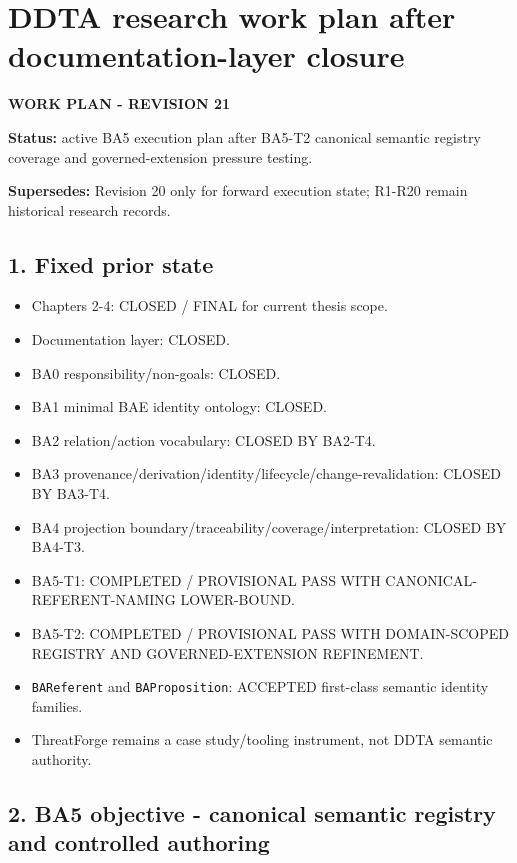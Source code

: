 \documentclass[
  10pt,
  a4paper,
]{article}
\author{}
\date{}
\providecommand{\tightlist}{%
  \setlength{\itemsep}{0pt}\setlength{\parskip}{0pt}}
\begin{document}
\section{DDTA research work plan after documentation-layer
closure}\label{ddta-research-work-plan-after-documentation-layer-closure}

\textbf{WORK PLAN - REVISION 21}

\textbf{Status:} active BA5 execution plan after BA5-T2 canonical
semantic registry coverage and governed-extension pressure testing.

\textbf{Supersedes:} Revision 20 only for forward execution state;
R1-R20 remain historical research records.

\subsection{1. Fixed prior state}\label{fixed-prior-state}

\begin{itemize}
\tightlist
\item
  Chapters 2-4: CLOSED / FINAL for current thesis scope.
\item
  Documentation layer: CLOSED.
\item
  BA0 responsibility/non-goals: CLOSED.
\item
  BA1 minimal BAE identity ontology: CLOSED.
\item
  BA2 relation/action vocabulary: CLOSED BY BA2-T4.
\item
  BA3 provenance/derivation/identity/lifecycle/change-revalidation:
  CLOSED BY BA3-T4.
\item
  BA4 projection boundary/traceability/coverage/interpretation: CLOSED
  BY BA4-T3.
\item
  BA5-T1: COMPLETED / PROVISIONAL PASS WITH CANONICAL-REFERENT-NAMING
  LOWER-BOUND.
\item
  BA5-T2: COMPLETED / PROVISIONAL PASS WITH DOMAIN-SCOPED REGISTRY AND
  GOVERNED-EXTENSION REFINEMENT.
\item
  \texttt{BAReferent} and \texttt{BAProposition}: ACCEPTED first-class
  semantic identity families.
\item
  ThreatForge remains a case study/tooling instrument, not DDTA semantic
  authority.
\end{itemize}

\subsection{2. BA5 objective - canonical semantic registry and
controlled
authoring}\label{ba5-objective---canonical-semantic-registry-and-controlled-authoring}
\end{document}
